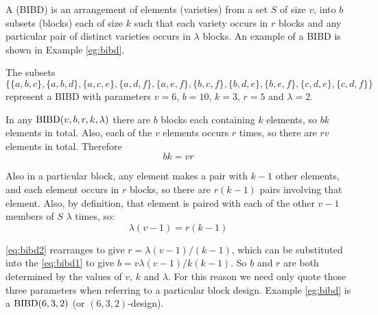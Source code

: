 A  (BIBD) is an arrangement of elements (varieties) from a set $S$ of size $v$, into $b$ subsets (blocks) each of size $k$ such that each variety occurs in $r$ blocks and any particular pair of distinct varieties occurs in $\lambda$ blocks.
An example of a BIBD is shown in Example \ref{eg:bibd}.

\begin{example}
\label{eg:bibd}
The subsets
\begin{equation}
\label{eq:bibd}
  \{\{a,b,c\}, \{a,b,d\}, \{a,c,e\}, \{a,d,f\}, \{a,e,f\}, \{b,c,f\}, \{b,d,e\}, \{b,e,f\}, \{c,d,e\}, \{c,d,f\}\}
\end{equation}
represent a BIBD with parameters $v = 6$, $b = 10$, $k = 3$, $r = 5$ and $\lambda = 2$.
\end{example}

In any $\operatorname{BIBD}(v, b, r, k, \lambda)$ there are $b$ blocks each containing $k$ elements, so $bk$ elements in total.
Also, each of the $v$ elements occurs $r$ times, so there are $rv$ elements in total.
Therefore
\begin{equation}
\label{eq:bibd1}
bk = vr
\end{equation}

Also in a particular block, any element makes a pair with $k - 1$ other elements, and each element occurs in $r$ blocks, so there are $r(k - 1)$ pairs involving that element.
Also, by definition, that element is paired with each of the other $v - 1$ members of $S$ $\lambda$ times, so:
\begin{equation}
\label{eq:bibd2}
\lambda (v - 1) = r(k - 1)
\end{equation}

\eqref{eq:bibd2} rearranges to give $r = \lambda (v - 1)/(k - 1)$, which can be substituted into the \eqref{eq:bibd1} to give $b = v\lambda (v - 1)/k(k - 1)$.
So $b$ and $r$ are both determined by the values of $v$, $k$ and $\lambda$.
For this reason we need only quote those three parameters when referring to a particular block design.
Example \ref{eg:bibd} is a $\operatorname{BIBD}(6, 3, 2)$ (or $(6, 3, 2)$-design).
